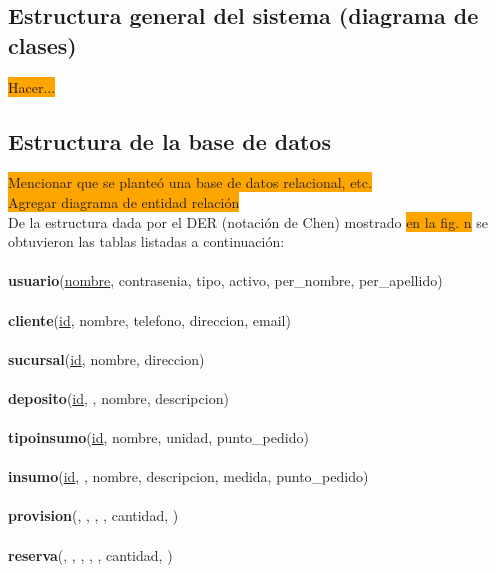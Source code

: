 \documentclass[a4paper, 12pt,twoside]{report}  %
\numberwithin{equation}{subsection} %
\begin{document}
\subsection{Estructura general del sistema (diagrama de clases)}
\colorbox{orange}{Hacer...}

\subsection{Estructura de la base de datos}
\colorbox{orange}{Mencionar que se planteó una base de datos relacional, etc.}\\
\colorbox{orange}{Agregar diagrama de entidad relación}\\
De la estructura dada por el DER (notación de Chen) mostrado \colorbox{orange}{en la fig. n} se obtuvieron las tablas listadas a continuación:
\\\\
\noindent\textbf{usuario}(\underline{nombre}, contrasenia, tipo, activo, per\_nombre, per\_apellido)
\\\\
\textbf{cliente}(\underline{id}, nombre, telefono, direccion, email)
\\\\
\textbf{sucursal}(\underline{id}, nombre, direccion)
\\\\
\textbf{deposito}(\underline{id}, \underline{}, nombre, descripcion)
\\\\
\textbf{tipo\-insumo}(\underline{id}, nombre, unidad, punto\_pedido)
\\\\
\textbf{insumo}(\underline{id}, \underline{}, nombre, descripcion, medida, punto\_pedido)
\\\\
\textbf{provision}(\underline{}, \underline{}, \underline{}, \underline{}, cantidad, \underline{})
\\\\
\textbf{reserva}(\underline{}, \underline{}, \underline{}, \underline{}, \underline{}, cantidad, \underline{})
\\\\
\end{document}
